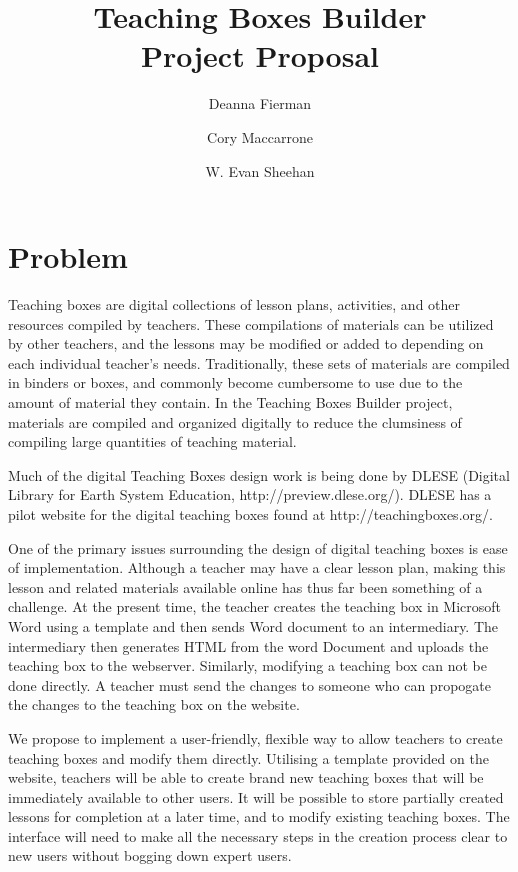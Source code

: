 \documentclass[11pt,letter]{article}
\title{Teaching Boxes Builder\\Project Proposal}
\author{Deanna Fierman \and Cory Maccarrone \and W. Evan Sheehan}
\begin{document}
\begin{titlepage}
	\maketitle
	\thispagestyle{empty}
\end{titlepage}

\section{Problem}

Teaching boxes are digital collections of lesson plans, activities, and other
resources compiled by teachers. These compilations of materials can be utilized
by other teachers, and the lessons may be modified or added to depending on each
individual teacher's needs. Traditionally, these sets of materials are compiled
in binders or boxes, and commonly become cumbersome to use due to the amount of
material they contain.  In the Teaching Boxes Builder project, materials are
compiled and organized digitally to reduce the clumsiness of compiling large
quantities of teaching material.

Much of the digital Teaching Boxes design work is being done by DLESE (Digital
Library for Earth System Education, http://preview.dlese.org/). DLESE has a
pilot website for the digital teaching boxes found at http://teachingboxes.org/.

One of the primary issues surrounding the design of digital teaching boxes is
ease of implementation.  Although a teacher may have a clear lesson plan, making
this lesson and related materials available online has thus far been something
of a challenge.  At the present time, the teacher creates the teaching box in
Microsoft Word using a template and then sends Word document to an intermediary.
The intermediary then generates HTML from the word Document and uploads the
teaching box to the webserver. Similarly, modifying a teaching box can not be
done directly. A teacher must send the changes to someone who can propogate the
changes to the teaching box on the website.

We propose to implement a user-friendly, flexible way to allow teachers to
create teaching boxes and modify them directly. Utilising a template provided on
the website, teachers will be able to create brand new teaching boxes that will
be immediately available to other users. It will be possible to store partially
created lessons for completion at a later time, and to modify existing teaching
boxes. The interface will need to make all the necessary steps in the creation
process clear to new users without bogging down expert users.
\end{document}
